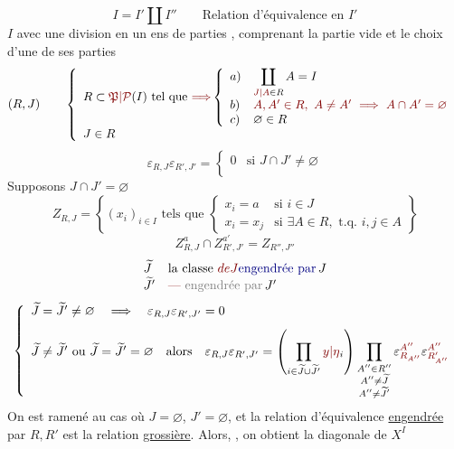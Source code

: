 \[
I=I'\amalg I''\qquad \text{Relation d'équivalence en }I'
\]
$I$ avec une division en un ens de parties
, comprenant la partie vide
et le choix d'une de ses parties
\[
(R,J)\qquad
\left\{\begin{array}{l}
R\subset\unsure{\mathfrak P|\mathcal P}(I)\text{ tel que }\deleted{\unsure{\Longrightarrow}}
\left\{\begin{array}{ll}
a)&\displaystyle\coprod_{\unsure{J|A}\in R}A=I\\
b)&\unsure{A,A'\in R,\ A\ne A'\ \Longrightarrow\ A\cap A'=\varnothing}\\
c)&\varnothing\in R
\end{array}\right.\\[8pt]
J\in R
\end{array}\right.
\]
\[
\varepsilon_{R,J}\varepsilon_{R',J'}
=\left\{\begin{array}{ll}0&\text{si }J\cap J'\ne\varnothing\\[6pt]&\end{array}\right.
\]
\deleted{\unsure{\S}}
Supposons $J\cap J'=\varnothing$
\[
Z_{R,J}=\left\{(x_i)_{i\in I}\text{ tels que }
\left\{\begin{array}{ll}
x_i=a&\text{si }i\in J\\
x_i=x_j&\text{si }\exists A\in R,\text{ t.q. }i,j\in A
\end{array}\right.\right\}
\]
\[
Z^a_{R,J}\cap Z^{a'}_{R',J'}=Z_{R'',J''}
\]
\[
\begin{array}{ll}
\widetilde J&\text{la classe }\deleted{\unsure{de J}}\inserted{\text{engendrée par}}\,J\\
\widetilde J'&\text{\unsure{---}}\ \deleted{\text{engendrée par}}\,J'
\end{array}
\]
\[
\left\{\begin{array}{l}
\widetilde J=\widetilde J'\ne\varnothing
\quad\Longrightarrow\quad
\varepsilon_{R,J}\varepsilon_{R',J'}=0\\[8pt]
\widetilde J\ne\widetilde J'\ \text{ou }\widetilde J=\widetilde J'=\varnothing
\quad\text{alors}\quad
\varepsilon_{R,J}\varepsilon_{R',J'}
=\left(\displaystyle\prod_{i\in\widetilde J\cup\widetilde J'}\unsure{y|\eta}_i\right)
\displaystyle\prod_{\substack{A''\in R''\\A''\ne\widetilde J\\A''\ne\widetilde J'}}
\varepsilon_{\unsure{R_{A''}}}^{\deleted{\unsure{A''}}}
\varepsilon_{\unsure{R'_{A''}}}^{\deleted{\unsure{A''}}}
\end{array}\right.
\]
On est ramené au cas où $J=\varnothing$, $J'=\varnothing$,
et la relation d'équivalence \uline{engendrée} par $R,R'$ est la relation
\uline{grossière}.
Alors, , on obtient la diagonale de $X^I$

